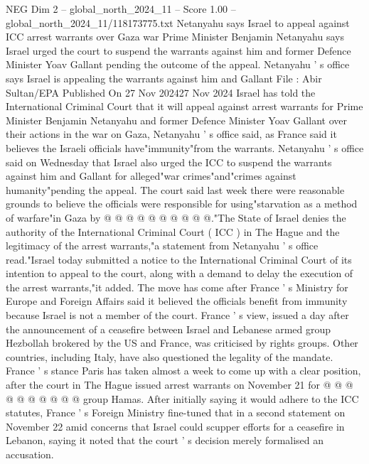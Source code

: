 \begin{textsample}{NEG Dim 2 – global\_north\_2024\_11 – Score 1.00 – global\_north\_2024\_11/118173775.txt}  \label{ex:f2_neg_098}
Netanyahu says Israel to appeal against ICC arrest warrants over Gaza war Prime Minister Benjamin Netanyahu says Israel urged the court to suspend the warrants against him and former Defence Minister Yoav Gallant pending the outcome of the appeal.
Netanyahu ' s office says Israel is appealing the warrants against him and Gallant File : Abir Sultan/EPA Published On 27 Nov 202427 Nov 2024 Israel has told the International Criminal Court that it will appeal against arrest warrants for Prime Minister Benjamin Netanyahu and former Defence Minister Yoav Gallant over their actions in the war on Gaza, Netanyahu ' s office said, as France said it believes the Israeli officials have"immunity"from the warrants.
Netanyahu ' s office said on Wednesday that Israel also urged the ICC to suspend the warrants against him and Gallant for alleged"war crimes"and"crimes against humanity"pending the appeal.
The court said last week there were reasonable grounds to believe the officials were responsible for using"starvation as a method of warfare"in Gaza by @ @ @ @ @ @ @ @ @ @."The State of Israel denies the authority of the International Criminal Court ( ICC ) in The Hague and the legitimacy of the arrest warrants,"a statement from Netanyahu ' s office read."Israel today submitted a notice to the International Criminal Court of its intention to appeal to the court, along with a demand to delay the execution of the arrest warrants,"it added.
The move has come after France ' s Ministry for Europe and Foreign Affairs said it believed the officials benefit from immunity because Israel is not a member of the court.
France ' s view, issued a day after the announcement of a ceasefire between Israel and Lebanese armed group Hezbollah brokered by the US and France, was criticised by rights groups.
Other countries, including Italy, have also questioned the legality of the mandate.
France ' s stance Paris has taken almost a week to come up with a clear position, after the court in The Hague issued arrest warrants on November 21 for @ @ @ @ @ @ @ @ @ @ group Hamas.
After initially saying it would adhere to the ICC statutes, France ' s Foreign Ministry fine-tuned that in a second statement on November 22 amid concerns that Israel could scupper efforts for a ceasefire in Lebanon, saying it noted that the court ' s decision merely formalised an accusation.

\end{textsample}
